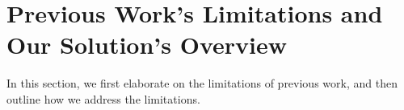 
\section{Previous Work's Limitations and Our Solution's Overview}
In this section, we first elaborate on the limitations of previous  work, and then outline how we address the limitations.  


